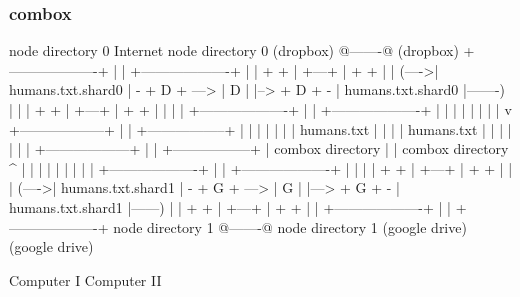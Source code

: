 \begin{frame}[fragile]
  \frametitle{combox}

  {\tiny
  \begin{semiverbatim}

         node directory 0                Internet              node directory 0
         (dropbox)                       @-------@             (dropbox)
        +-------------------+            |       |            +-------------------+
        |                   |    + +     | +---+ |     + +    |                   |
  (---->| humans.txt.shard0 | - + D + ---> | D | |--> + D + - | humans.txt.shard0 |-------)
  |     |                   |    + +     | +---+ |     + +    |                   |       |
  |     +-------------------+            |       |            +-------------------+       |
  |                                      |       |                                        |
  |                                      |       |                                        v
 +------------------+                    |       |                        +-----------------+
 |                  |                    |       |                        |                 |
 |  humans.txt      |                    |       |                        | humans.txt      |
 |                  |                    |       |                        |                 |
 +------------------+                    |       |                        +-----------------+
  |  combox directory                    |       |                      combox directory  ^
  |                                      |       |                                        |
  |                                      |       |                                        |
  |     +-------------------+            |       |             +-------------------+      |
  |     |                   |    + +     | +---+ |      + +    |                   |      |
  (---->| humans.txt.shard1 | - + G + ---> | G | |---> + G + - | humans.txt.shard1 |------)
        |                   |    + +     | +---+ |      + +    |                   |
        +-------------------+            |       |             +-------------------+
         node directory 1                @-------@              node directory 1
         (google drive)                                         (google drive)

  Computer I                                                                    Computer II
  \end{semiverbatim}
  }

\end{frame}


